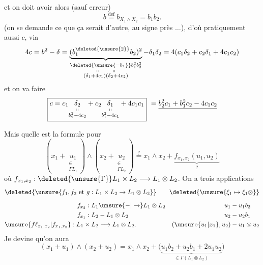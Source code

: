 et on doit avoir alors (sauf erreur)
\[
\boxed{b\overset{\mathrm{def}}=b_{X_1\wedge X_2}=b_1b_2}.
\]
(on se demande ce que ça serait d'autre, au signe près $\ldots$), d'où pratiquement aussi $c$, via
\[
4c=b^2-\delta=\underbrace{(b_1^{\deleted{\unsure{2}}}b_2)^2}_{\substack{\deleted{\unsure{=b_1}}b_1^2b_2^2\\\shortparallel\qquad\shortparallel\\(\delta_1+4c_1)(\delta_2+4c_2)}}-\delta_1\delta_2=4(c_1\delta_2+c_2\delta_1+4c_1c_2)
\]
et on va faire
\[
\boxed{c=c_1\underset{\substack{\shortparallel\\b_2^2-4c_2}}{\delta_2}+c_2\underset{\substack{\shortparallel\\b_1^2-4c_1}}{\delta_1}+4c_1c_1}\ =\underline{b_2^2c_1+b_1^2c_2-4c_1c_2}
\]

Mais quelle est la formule pour
\[
(x_1+\underset{\substack{\in\\\Gamma L_1}}{u_1})\wedge(x_2+\underset{\substack{\in\\\Gamma L_2}}{u_2})\overset{?}=x_1\wedge x_2+\underbrace{f_{x_1,x_2}(u_1,u_2)}_{?}
\]
où $f_{x_1,x_2}:\deleted{\unsure{\Gamma}}L_1\times L_2\longrightarrow L_1\otimes L_2$.
On a trois applications  
\[
\deleted{\unsure{f_1,f_2\text{ et }g:L_1\times L_2\to L_1\otimes L_2}}\qquad\deleted{\unsure{\xi_1\mapsto \xi_1\otimes}}
\]
\[
\begin{aligned}f_{x_2}:L_1&\unsure{\mathbin{-}|\to}L_1\otimes L_2&u_1&\mathbin{-}u_1b_2\\ f_{x_1}:L_2&\mathbin{-}L_1\otimes L_2&u_2&\mathbin{-}u_2b_1\\ \unsure{f\ell_{x_1,x_2}|f_{x_1,x_2}}:L_1\times L_2&\longrightarrow L_1\otimes L_2.&(\unsure{u_1|x_1},u_2)&\mathbin{-}u_1\otimes u_2\end{aligned}
\]
Je devine qu'on aura
\[
\boxed{(x_1+u_1)\wedge(x_2+u_2)=x_1\wedge x_2+\big(\underbrace{u_1b_2+u_2b_1+2u_1u_2}_{\in\Gamma(L_1\otimes L_2)}\big)}
\]
